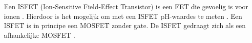 Een ISFET (Ion-Sensitive Field-Effect Transistor) is een FET die gevoelig is voor ionen \cite{modeling,isfetAsAnElectronicDevice,bergveld1985impactOfMosfetBasedSensors,bergveld2003thirtyYearsISFET}. Hierdoor is het mogelijk om met een ISFET pH-waardes te meten \cite{modeling,isfetAsAnElectronicDevice,bergveld1985impactOfMosfetBasedSensors,bergveld2003thirtyYearsISFET}. Een ISFET is in principe een MOSFET zonder gate. De ISFET gedraagt zich als een \si{\pH} afhankelijke MOSFET \cite{isfetAsAnElectronicDevice,bergveld1985impactOfMosfetBasedSensors,bergveld2003thirtyYearsISFET}.

